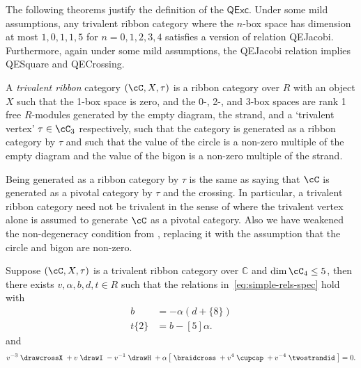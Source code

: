 \documentclass[12pt]{amsart}
\begin{document}
The following theorems justify the definition of the $\mathsf{QExc}$.  Under
some mild assumptions, any trivalent ribbon category where the $n$-box space
has dimension at most $1,0,1,1,5$ for $n=0,1,2,3,4$ satisfies a version of
relation QEJacobi.  Furthermore, again under some mild assumptions, the
QEJacobi relation implies QESquare and QECrossing.


\begin{definition}
A \emph{trivalent ribbon} category $(\cC, X, \tau)$ is a ribbon category over
$R$ with  an object $X$ such that
the 1-box space is zero, and the 0-, 2-, and 3-box spaces are rank 1 free $R$-modules
generated by the empty diagram, the strand, and a `trivalent vertex' $\tau \in \cC_3$ 
respectively, such that the category is
generated as a ribbon category by $\tau$ and such that the value of the circle
is a non-zero multiple of the empty diagram and the value of the bigon is a
non-zero multiple of the strand.
\end{definition}

Being generated as a ribbon category by $\tau$ is the same as saying that
$\cC$ is generated as a pivotal category by $\tau$ and the crossing.  In
particular, a trivalent ribbon category need not be trivalent in the sense of
\cite{MR3624901} where the trivalent vertex alone is assumed to generate $\cC$ 
as a pivotal category.  Also we have weakened the non-degeneracy condition from
\cite{MR3624901}, replacing it with the assumption that the circle and bigon
are non-zero.

\begin{theorem} \label{thm:Jacobi}
Suppose $(\cC, X, \tau)$ is a trivalent ribbon category over
$\mathbb{C}$ and $\dim{\cC_4} \leq 5$, then there exists $v, \alpha,
b, d, t \in R$ such that the relations in~\eqref{eq:simple-rels-spec}
hold with
\begin{align*}
  [5] b &= - \alpha (d+\{8\}) \\
  t \{2\} &= b-[5] \alpha.
\end{align*}
and
\begin{equation}
v^{-3} \;
\drawcrossX
\;+ v \;
\drawI
\; -v^{-1} \;
 \drawH
\;
 + \alpha
\left[\; \braidcross \;
 + v^{4}\;
\cupcap
\; + v^{-4} \;
 \twostrandid \;
 \right] = 0.\label{eq:quant-except-gen}
\end{equation}
\end{theorem}
\end{document}
